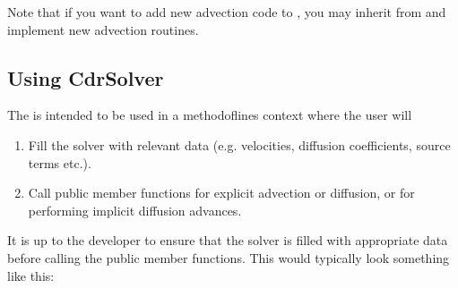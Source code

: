 \documentclass[letterpaper,10pt,english]{sphinxmanual}
\begin{document}
\sphinxAtStartPar
Note that if you want to add new advection code to , you may inherit from  and implement new advection routines.


\subsection{Using CdrSolver}
\label{\detokenize{Solvers/CDR:using-cdrsolver}}
\sphinxAtStartPar
The  is intended to be used in a method\sphinxhyphen{}of\sphinxhyphen{}lines context where the user will
\begin{enumerate}
%
\item {} 
\sphinxAtStartPar
Fill the solver with relevant data (e.g. velocities, diffusion coefficients, source terms etc.).

\item {} 
\sphinxAtStartPar
Call public member functions for explicit advection or diffusion, or for performing implicit diffusion advances.

\end{enumerate}

\sphinxAtStartPar
It is up to the developer to ensure that the solver is filled with appropriate data before calling the public member functions.
This would typically look something like this:

\begin{sphinxVerbatim}[commandchars=\\\{\},formatcom=\scriptsize]
   
        
       \PYG{p}{[}\PYG{p}{]}

         
         \PYG{p}{[}\PYG{p}{]}\PYG{p}{[}\PYG{p}{]}


\end{sphinxVerbatim}
\end{document}
